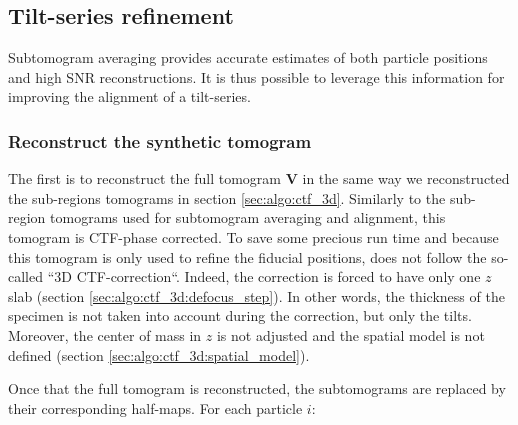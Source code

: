 \subsection{Tilt-series refinement} \label{sec:algo:tomoCPR}


Subtomogram averaging provides accurate estimates of both particle positions and high SNR reconstructions. It is thus possible to leverage this information for improving the alignment of a tilt-series.


\subsubsection{Reconstruct the synthetic tomogram}

The first is to reconstruct the full tomogram $\bm{V}$ in the same way we reconstructed the sub-regions tomograms in section \ref{sec:algo:ctf_3d}. Similarly to the sub-region tomograms used for subtomogram averaging and alignment, this tomogram is CTF-phase corrected. To save some precious run time and because this tomogram is only used to refine the fiducial positions, {\emClarity} does not follow the so-called ``3D CTF-correction``. Indeed, the correction is forced to have only one $z$ slab (section \ref{sec:algo:ctf_3d:defocus_step}). In other words, the thickness of the specimen is not taken into account during the correction, but only the tilts. Moreover, the center of mass in $z$ is not adjusted and the spatial model is not defined (section \ref{sec:algo:ctf_3d:spatial_model}).


Once that the full tomogram is reconstructed, the subtomograms are replaced by their corresponding half-maps. For each particle $i$:

